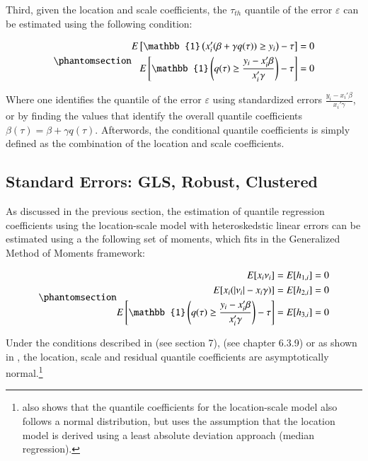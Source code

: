\documentclass[
  authoryear,
  review,
  1p]{elsarticle}
\begin{document}
Third, given the location and scale coefficients, the \(\tau_{th}\)
quantile of the error \(\varepsilon\) can be estimated using the
following condition:

\begin{equation}\phantomsection\label{eq-eq9}{\begin{aligned}
  E\left[  \mathbb{1}\left(x_i' (\beta +   \gamma q(\tau)) \geq y_i \right) - \tau \right] &=0  \\
  E\left[  \mathbb{1}\left(   q(\tau) \geq \frac{y_i-x_i'\beta}{x_i'\gamma} \right) - \tau \right] &=0  \\
  \end{aligned}
}\end{equation}

Where one identifies the quantile of the error \(\varepsilon\) using
standardized errors \(\frac{y_i-x_i'\beta}{x_i'\gamma}\), or by finding
the values that identify the overall quantile coefficients
\(\beta(\tau)=\beta + \gamma q(\tau)\). Afterwords, the conditional
quantile coefficients is simply defined as the combination of the
location and scale coefficients.

\subsection{Standard Errors: GLS, Robust, Clustered}\label{sec-se}

As discussed in the previous section, the estimation of quantile
regression coefficients using the location-scale model with
heteroskedstic linear errors can be estimated using a the following set
of moments, which fits in the Generalized Method of Moments framework:

\begin{equation}\phantomsection\label{eq-eq10}{\begin{aligned}
  E[x_i \nu_i  ] &= E[h_{1,i}]=0 \\
  E[x_i  (|\nu_i|-x_i \gamma) ] &=E[h_{2,i}]=0 \\
  E\left[  \mathbb{1}\left(   q(\tau)\geq \frac{y_i-x_i'\beta}{x_i'\gamma} \right) - \tau \right] 
  &=E[h_{3,i}]=0 
  \end{aligned}
}\end{equation}

Under the conditions described in \citet{newey_chapter_1994} (see
section 7), \citet{cameron2005} (see chapter 6.3.9) or as shown in
\citet{mss2019}, the location, scale and residual quantile coefficients
are asymptotically normal.\footnote{\citet{zhao2000} also shows that the
  quantile coefficients for the location-scale model also follows a
  normal distribution, but uses the assumption that the location model
  is derived using a least absolute deviation approach (median
  regression).}
\end{document}
